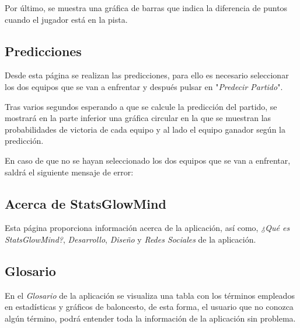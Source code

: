 Por último, se muestra una gráfica de barras que indica la diferencia de puntos cuando el jugador está en la pista.


\subsection{Predicciones}

Desde esta página se realizan las predicciones, para ello es necesario seleccionar los dos equipos que se van a enfrentar y después pulsar en "\textit{Predecir Partido}".


Tras varios segundos esperando a que se calcule la predicción del partido, se mostrará en la parte inferior una gráfica circular en la que se muestran las probabilidades de victoria de cada equipo y al lado el equipo ganador según la predicción.


En caso de que no se hayan seleccionado los dos equipos que se van a enfrentar, saldrá el siguiente mensaje de error:

\subsection{Acerca de StatsGlowMind}

Esta página proporciona información acerca de la aplicación, así como, \textit{¿Qué es StatsGlowMind?}, \textit{Desarrollo}, \textit{Diseño} y \textit{Redes Sociales} de la aplicación.

\subsection{Glosario}
En el \textit{Glosario} de la aplicación se visualiza una tabla con los términos empleados en estadísticas y gráficos de baloncesto, de esta forma, el usuario que no conozca algún término, podrá entender toda la información de la aplicación sin problema.
